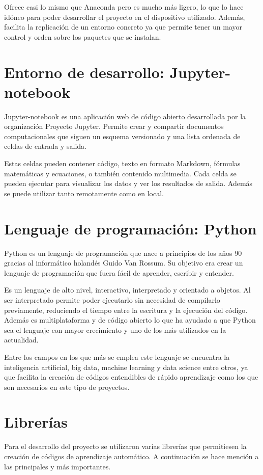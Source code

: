 \documentclass[a4paper, 12pt]{book}
\begin{document}
Ofrece casi lo mismo que Anaconda pero es mucho más ligero, lo que lo hace idóneo para poder desarrollar el proyecto en el dispositivo utilizado. Además, facilita la replicación de un entorno concreto ya que permite tener un mayor control y orden sobre los paquetes que se instalan. 

\section{Entorno de desarrollo: Jupyter-notebook}
\label{sec:entorno_de_desarrollo}

Jupyter-notebook es una aplicación web de código abierto desarrollada por la organización Proyecto Jupyter. Permite crear y compartir documentos computacionales que siguen un esquema versionado y una lista ordenada de celdas de entrada y salida.

Estas celdas pueden contener código, texto en formato Markdown, fórmulas matemáticas y ecuaciones, o también contenido multimedia. Cada celda se pueden ejecutar para visualizar los datos y ver los resultados de salida. Además se puede utilizar tanto remotamente como en local.

\section{Lenguaje de programación: Python}
\label{sec:lenguaje_de_programación}

Python es un lenguaje de programación que nace a principios de los años 90 gracias al informático holandés Guido Van Rossum. Su objetivo era crear un lenguaje de programación que fuera fácil de aprender, escribir y entender.

Es un lenguaje de alto nivel, interactivo, interpretado y orientado a objetos. Al ser interpretado permite poder ejecutarlo sin necesidad de compilarlo previamente, reduciendo el tiempo entre la escritura y la ejecución del código.
Además es multiplataforma y de código abierto lo que ha ayudado a que Python sea el lenguaje con mayor crecimiento y uno de los más utilizados en la actualidad.  

Entre los campos en los que más se emplea este lenguaje se encuentra la inteligencia artificial, big data, machine learning y data science entre otros, ya que facilita la creación de códigos entendibles de rápido aprendizaje como los que son necesarios en este tipo de proyectos.

\section{Librerías}
\label{sec:Librerías}
Para el desarrollo del proyecto se utilizaron varias librerías que permitiesen la creación de códigos de aprendizaje automático. A continuación se hace mención a las principales y más importantes.
\end{document}
